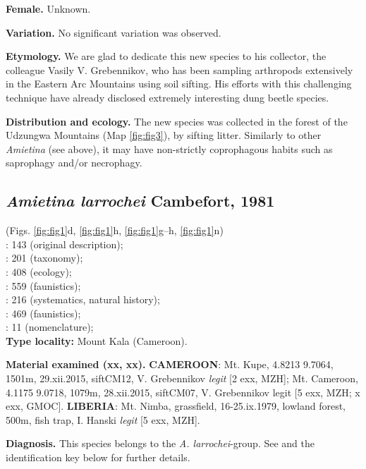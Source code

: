 \documentclass[fleqn,10pt,lineno]{wlpeerj}
\begin{document}
\textbf{Female.} Unknown.

\textbf{Variation.} No significant variation was observed.

\textbf{Etymology.} We are glad to dedicate this new species to his collector, the colleague Vasily V. Grebennikov, who has been sampling arthropods extensively in the Eastern Arc Mountains using soil sifting. His efforts with this challenging technique have already disclosed extremely interesting dung beetle species.

\textbf{Distribution and ecology.} The new species was collected in the forest of the Udzungwa Mountains (Map \ref{fig:fig3}), by sifting litter. Similarly to other \textit{Amietina} (see above), it may have non-strictly coprophagous habits such as saprophagy and/or necrophagy.

\subsection*{\textbf{\textit{Amietina larrochei} Cambefort, 1981}}
(Figs. \ref{fig:fig1}d, \ref{fig:fig1}h, \ref{fig:fig1}g--h, \ref{fig:fig1}n) \\
\cite{cambefort1981amietina}: 143 (original description);\\
\cite{branco1988deux}: 201 (taxonomy);\\
\cite{cambefort1991dung}: 408 (ecology);\\
\cite{cambefort2003nimba}: 559 (faunistics);\\
\cite{davis2008african}: 216 (systematics, natural history);\\
\cite{moretto2010bayanga}: 469 (faunistics);\\
\cite{branco2014scarabaeidae}: 11 (nomenclature);\\

\textbf{Type locality:} Mount Kala (Cameroon).

\textbf{Material examined (xx\male\male, xx\female\female).} \textbf{CAMEROON}: Mt. Kupe, 4.8213 9.7064, 1501m, 29.xii.2015, siftCM12, V. Grebennikov \textit{legit} [2 exx, MZH]; Mt. Cameroon, 4.1175 9.0718, 1079m, 28.xii.2015, siftCM07, V. Grebennikov legit [5 exx, MZH; x exx, GMOC]. \textbf{LIBERIA}: Mt. Nimba, grassfield, 16-25.ix.1979, lowland forest, 500m, fish trap, I. Hanski \textit{legit} [5 exx, MZH].

\textbf{Diagnosis.} This species belongs to the \textit{A. larrochei}-group. See \citep{branco1988deux} and the identification key below for further details.
\end{document}
